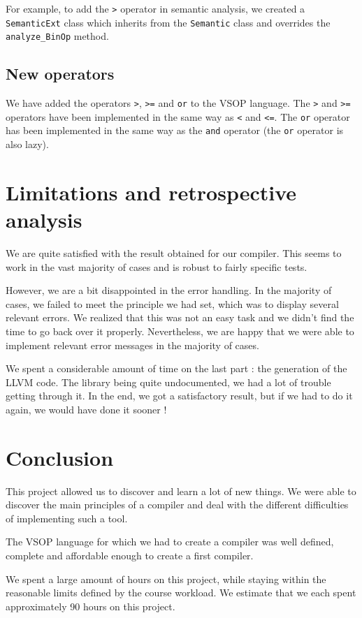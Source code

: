 \documentclass[a4paper, 12pt]{article}
\begin{document}
    For example, to add the \texttt{>} operator in semantic analysis, we created a \texttt{SemanticExt} class which inherits from the \texttt{Semantic} class and overrides the \texttt{analyze\_BinOp} method.
    
    \subsection{New operators}
    
    We have added the operators \texttt{>}, \texttt{>=} and \texttt{or} to the VSOP language. The \texttt{>} and \texttt{>=} operators have been implemented in the same way as \texttt{<} and \texttt{<=}. The \texttt{or} operator has been implemented in the same way as the \texttt{and} operator (the \texttt{or} operator is also lazy).
    
    
    \section{Limitations and retrospective analysis}
    
    We are quite satisfied with the result obtained for our compiler. This seems to work in the vast majority of cases and is robust to fairly specific tests.
    
    However, we are a bit disappointed in the error handling. In the majority of cases, we failed to meet the principle we had set, which was to display several relevant errors. We realized that this was not an easy task and we didn't find the time to go back over it properly. Nevertheless, we are happy that we were able to implement relevant error messages in the majority of cases.
    
    We spent a considerable amount of time on the last part : the generation of the LLVM code. The library being quite undocumented, we had a lot of trouble getting through it. In the end, we got a satisfactory result, but if we had to do it again, we would have done it sooner !
    
    
    \section{Conclusion}
    
    This project allowed us to discover and learn a lot of new things. We were able to discover the main principles of a compiler and deal with the different difficulties of implementing such a tool.
    
    The VSOP language for which we had to create a compiler was well defined, complete and affordable enough to create a first compiler.
    
    We spent a large amount of hours on this project, while staying within the reasonable limits defined by the course workload. We estimate that we each spent approximately 90 hours on this project.
\end{document}
